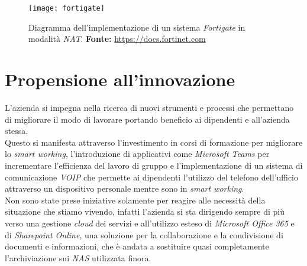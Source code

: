 \vspace{10pt}
\begin{figure}[htbp]
	\begin{center}
		\texttt{[image: fortigate]}
		\caption{Diagramma dell'implementazione di un sistema \textit{Fortigate} in modalità \textit{NAT}. \newline \textbf{Fonte: } \url{https://docs.fortinet.com}}
		\label{fig:fortigate}
	\end{center}
\end{figure}
\vspace{10pt}


\section{Propensione all'innovazione}

L'azienda si impegna nella ricerca di nuovi strumenti e processi che permettano di migliorare il modo di lavorare portando beneficio ai dipendenti e all'azienda stessa.\\
Questo si manifesta attraverso l'investimento in corsi di formazione per migliorare lo \textit{smart working}, l'introduzione di applicativi come \textit{Microsoft Teams} per incrementare l'efficienza del lavoro di gruppo e l'implementazione di un sistema di comunicazione \textit{VOIP} che permette ai dipendenti l'utilizzo del telefono dell'ufficio attraverso un dispositivo personale mentre sono in \textit{smart working}. \\
Non sono state prese iniziative solamente per reagire alle necessità della situazione che stiamo vivendo, infatti l'azienda si sta dirigendo sempre di più verso una gestione \textit{cloud} dei servizi e all'utilizzo esteso di \textit{Microsoft Office 365} e di \textit{Sharepoint Online}, una soluzione per la collaborazione e la condivisione di documenti e informazioni, che è andata a sostituire quasi completamente l'archiviazione sui \textit{NAS} utilizzata finora.






